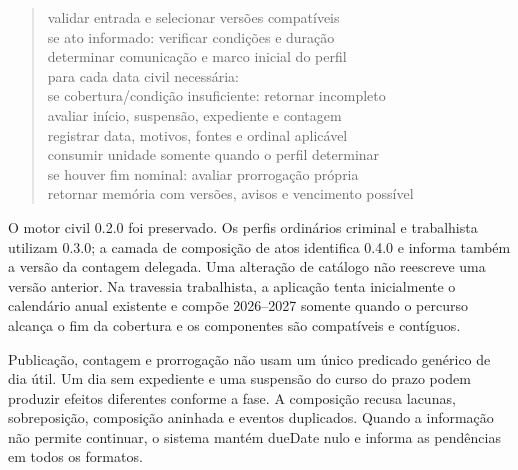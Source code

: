 \begin{quote}\begin{singlespace}\raggedright\ttfamily\footnotesize
\hspace*{0.0em}validar entrada e selecionar versões compatíveis\\
\hspace*{0.0em}se ato informado: verificar condições e duração\\
\hspace*{0.0em}determinar comunicação e marco inicial do perfil\\
\hspace*{0.0em}para cada data civil necessária:\\
\hspace*{2.0em}se cobertura/condição insuficiente: retornar incompleto\\
\hspace*{2.0em}avaliar início, suspensão, expediente e contagem\\
\hspace*{2.0em}registrar data, motivos, fontes e ordinal aplicável\\
\hspace*{2.0em}consumir unidade somente quando o perfil determinar\\
\hspace*{0.0em}se houver fim nominal: avaliar prorrogação própria\\
\hspace*{0.0em}retornar memória com versões, avisos e vencimento possível\\
\end{singlespace}\end{quote}
O motor civil 0.2.0 foi preservado. Os perfis ordinários criminal e trabalhista utilizam 0.3.0; a camada de composição de atos identifica 0.4.0 e informa também a versão da contagem delegada. Uma alteração de catálogo não reescreve uma versão anterior. Na travessia trabalhista, a aplicação tenta inicialmente o calendário anual existente e compõe 2026--2027 somente quando o percurso alcança o fim da cobertura e os componentes são compatíveis e contíguos.

Publicação, contagem e prorrogação não usam um único predicado genérico de dia útil. Um dia sem expediente e uma suspensão do curso do prazo podem produzir efeitos diferentes conforme a fase. A composição recusa lacunas, sobreposição, composição aninhada e eventos duplicados. Quando a informação não permite continuar, o sistema mantém dueDate nulo e informa as pendências em todos os formatos.

